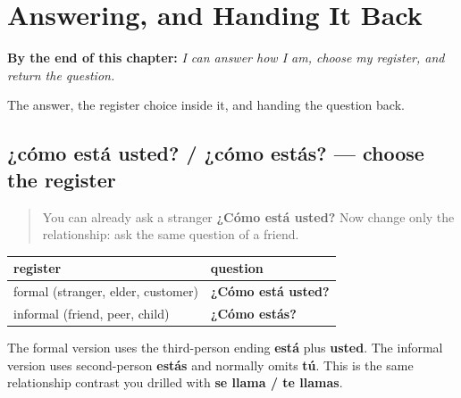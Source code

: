 
\chapter{Answering, and Handing It Back}
\label{ch:how-are-you}

\begin{chapteropening}
\textbf{By the end of this chapter:} \emph{I can answer how I am, choose my register, and return the question.}

The answer, the register choice inside it, and handing the question back.
\end{chapteropening}

\section[¿cómo está usted? / ¿cómo estás?]{¿cómo está usted? / ¿cómo estás? — choose the register}

\label{lesson:ES-C04-como-estas-register}



\begin{quote}
You can already ask a stranger \textbf{¿Cómo está usted?} Now change only the relationship: ask the same question of a friend.
\end{quote}

\begin{grammarlens}[title={Grammar Lens: one question, two relationships}]
\noindent
\begin{tabularx}{\linewidth}{@{}>{\raggedright\arraybackslash}X>{\raggedright\arraybackslash}X@{}}
\toprule
\textbf{register} & \textbf{question} \\
\midrule
formal (stranger, elder, customer) & \textbf{¿Cómo está usted?} \\
informal (friend, peer, child) & \textbf{¿Cómo estás?} \\
\bottomrule
\end{tabularx}

The formal version uses the third-person ending \textbf{está} plus \textbf{usted}. The informal version uses second-person \textbf{estás} and normally omits \textbf{tú}. This is the same relationship contrast you drilled with \textbf{se llama / te llamas}.
\end{grammarlens}


